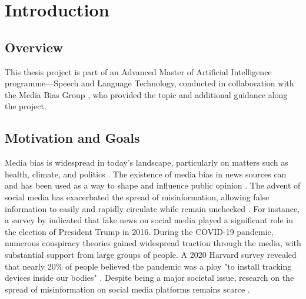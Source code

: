 \chapter{Introduction}
\label{cha:1}

\section{Overview}

This thesis project is part of an Advanced Master of Artificial Intelligence programme—Speech and Language Technology, conducted in collaboration with the Media Bias Group \cite{media-bias-group}, who provided the topic and additional guidance along the project.

\section{Motivation and Goals}

Media bias is widespread in today's landscape, particularly on matters such as health, climate, and politics \cite{suarez-2021-prevalence-health-misinformation,wang-2024-health-misinformation,fleming-2023-climate-disinformation,tiedemann-2024-misinformation-democracy}. The existence of media bias in news sources can and has been used as a way to shape and influence public opinion \cite{aires-2020-information}. The advent of social media has exacerbated the spread of misinformation, allowing false information to easily and rapidly circulate  while remain unchecked \cite{froehlich-2024-misinformation}. For instance, a survey by \cite{allcott-2017-fake-news-election} indicated that fake news on social media played a significant role in the election of President Trump in 2016. During the COVID-19 pandemic, numerous conspiracy theories gained widespread traction through the media, with substantial support from large groups of people. A 2020 Harvard survey revealed that nearly 20\% of people believed the pandemic was a ploy "to install tracking devices inside our bodies" \cite{enders-2020-covid19-misinformation}. Despite being a major societal issue, research on the spread of misinformation on social media platforms remains scarce \cite{muhammed-2022-disaster-of-misinformation}.

